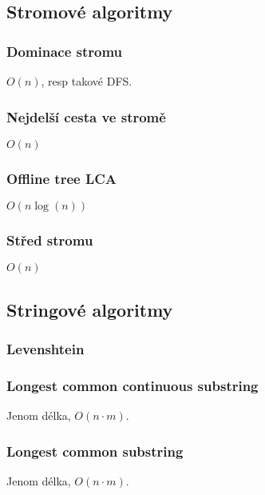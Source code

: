 \documentclass[10pt, a4paper]{article}
\begin{document}
\subsection{Stromové algoritmy}

\subsubsection{Dominace stromu}
$O(n)$, resp takové DFS.


\subsubsection{Nejdelší cesta ve stromě}
$O(n)$


\subsubsection{Offline tree LCA}
$O(n\log(n))$


\subsubsection{Střed stromu}
$O(n)$



\subsection{Stringové algoritmy}

\subsubsection{Levenshtein}


\subsubsection{Longest common continuous substring}
Jenom délka, $O(n \cdot m)$.


\subsubsection{Longest common substring}
Jenom délka, $O(n \cdot m)$.

\end{document}
